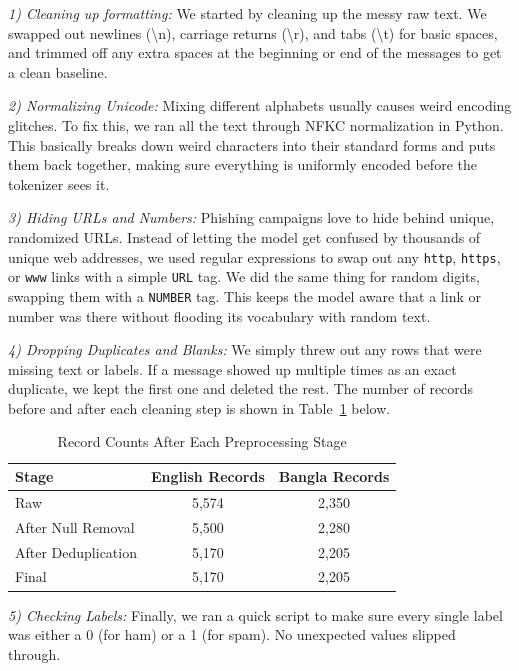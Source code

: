 \documentclass[journal]{IEEEtran}
\begin{document}
\textit{1) Cleaning up formatting:} We started by cleaning up the messy raw text. We swapped out newlines (\textbackslash n), carriage returns (\textbackslash r), and tabs (\textbackslash t) for basic spaces, and trimmed off any extra spaces at the beginning or end of the messages to get a clean baseline.

\textit{2) Normalizing Unicode:} Mixing different alphabets usually causes weird encoding glitches. To fix this, we ran all the text through NFKC normalization in Python. This basically breaks down weird characters into their standard forms and puts them back together, making sure everything is uniformly encoded before the tokenizer sees it.

\textit{3) Hiding URLs and Numbers:} Phishing campaigns love to hide behind unique, randomized URLs. Instead of letting the model get confused by thousands of unique web addresses, we used regular expressions to swap out any \texttt{http}, \texttt{https}, or \texttt{www} links with a simple \texttt{URL} tag. We did the same thing for random digits, swapping them with a \texttt{NUMBER} tag. This keeps the model aware that a link or number was there without flooding its vocabulary with random text.

\textit{4) Dropping Duplicates and Blanks:} We simply threw out any rows that were missing text or labels. If a message showed up multiple times as an exact duplicate, we kept the first one and deleted the rest. The number
of records before and after each cleaning step is shown in Table~\ref{tab:dataset_prep}
below.

\begin{table}[htbp]
\caption{Record Counts After Each Preprocessing Stage}
\label{tab:dataset_prep}
\centering
\begin{tabular}{lcc}
\toprule
\textbf{Stage} & \textbf{English Records} & \textbf{Bangla Records} \\
\midrule
Raw & 5,574 & 2,350 \\
After Null Removal & 5,500 & 2,280 \\
After Deduplication & 5,170 & 2,205 \\
Final & 5,170 & 2,205 \\
\bottomrule
\end{tabular}
\end{table}

\textit{5) Checking Labels:} Finally, we ran a quick script to make sure every single label was either a 0 (for ham) or a 1 (for spam). No unexpected values slipped through.
\end{document}
